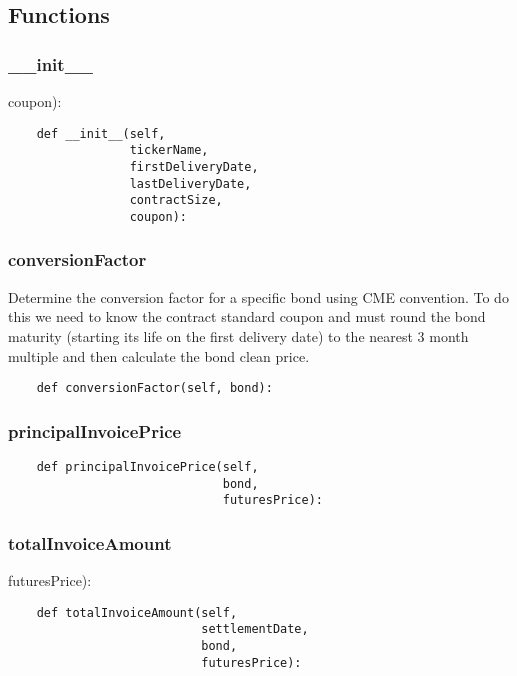 \documentclass[twoside,11pt]{book}
\begin{document}
\subsection*{Functions}

\subsubsection*{{\bf \_\_init\_\_}}
coupon): 

\begin{lstlisting}
    def __init__(self,
                 tickerName,
                 firstDeliveryDate,
                 lastDeliveryDate,
                 contractSize,
                 coupon):
\end{lstlisting}

\subsubsection*{{\bf conversionFactor}}
Determine the conversion factor for a specific bond using CME convention. To do this we need to know the contract standard coupon and must round the bond maturity (starting its life on the first delivery date) to the nearest 3 month multiple and then calculate the bond clean price.  

\begin{lstlisting}
    def conversionFactor(self, bond):
\end{lstlisting}

\subsubsection*{{\bf principalInvoicePrice}}


\begin{lstlisting}
    def principalInvoicePrice(self,
                              bond,
                              futuresPrice):
\end{lstlisting}

\subsubsection*{{\bf totalInvoiceAmount}}
futuresPrice): 

\begin{lstlisting}
    def totalInvoiceAmount(self,
                           settlementDate,
                           bond,
                           futuresPrice):
\end{lstlisting}
\end{document}
